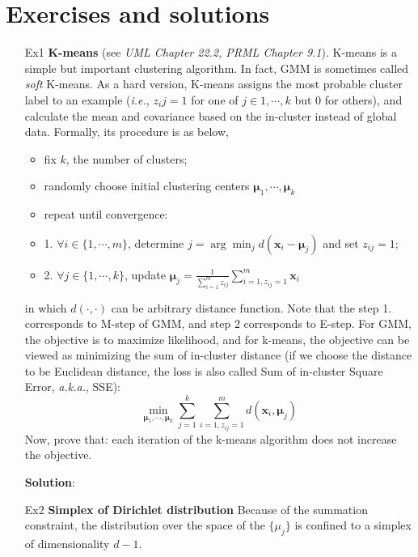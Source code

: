 \documentclass{article}
\begin{document}
\section{Exercises and solutions}
\begin{itemize}
\item[Ex1] \textbf{K-means} (see \textit{UML Chapter 22.2, PRML Chapter 9.1}). K-means is a simple but important clustering algorithm. In fact, GMM is sometimes called \textit{soft} K-means. As a hard version, K-means assigns the most probable cluster label to an example (\textit{i.e.}, $z_ij=1$ for one of $j\in{1,\cdots,k}$ but 0 for others), and calculate the mean and covariance based on the in-cluster instead of global data. Formally, its procedure is as below,

	\begin{shaded}
    \begin{itemize}
	\item fix $k$, the number of clusters;
	\item randomly choose initial clustering centers $\bm{\mu}_1,\cdots,\bm{\mu}_k$
	\item repeat until convergence:
	\item 1. $\forall i\in \{1,\cdots,m\}$, determine $j=\arg\min_{j} d(\bm{x}_i-\bm{\mu}_j)$ and set $z_{ij}=1$;
	\item 2. $\forall j\in \{1,\cdots,k\}$, update $\bm{\mu}_j = \frac{1}{\sum_{i=1}^m z_{ij}} \sum_{i=1,z_{ij}=1}^m \bm{x}_i$
	\end{itemize}
  	\end{shaded}
in which $d(\cdot,\cdot)$ can be arbitrary distance function. Note that the step 1. corresponds to M-step of GMM, and step 2 corresponds to E-step. For GMM, the objective is to maximize likelihood, and for k-means, the objective can be viewed as minimizing the sum of in-cluster distance (if we choose the distance to be Euclidean distance, the loss is also called Sum of in-cluster Square Error, \textit{a.k.a.}, SSE):
	\begin{equation*}
	\min_{\bm{\mu}_1,\cdots,\bm{\mu}_k} \sum_{j=1}^k \sum_{i=1, z_{ij}=1}^m d(\bm{x}_i, \bm{\mu}_j)
	\end{equation*}
Now, prove that: each iteration of the k-means algorithm does not increase the objective.

\item[] \textbf{Solution}:

\item[Ex2] \textbf{Simplex of Dirichlet distribution} Because of the summation constraint, the distribution over the space of the $\{\mu_j\}$ is confined to a simplex of dimensionality $d-1$.


\end{itemize}
\end{document}
